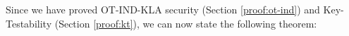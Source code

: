 Since we have proved OT-IND-KLA security (Section
\ref{proof:ot-ind}) and Key-Testability (Section
\ref{proof:kt}), we can now state the following theorem:






\begin{comment}
We will now use the fact that for a BB84-based SKE-CD
scheme $\SKECD$, the deterministic algorithm $\SKECD.\CDec$
satisfies the following property. Let $\skecd.\sk$ be a secret key
of $\SKECD$ and $\aux_0$ be generated by $\SKECD.\qEnc(\skecd.\sk,
\cdot)$. Let $u, u' \in \bit^\ctlen$ be any
strings such that for all $i$ such that $\theta[i]=0$, $u[i] =
u[i']$. Then, it must be that $\SKECD.\CDec(\skecd.\sk, u,
\aux_0) = \SKECD.\CDec(\skecd.\sk, u', \aux_0)$.
As a
consequence, for all valid $\ct$, it must also hold that
$\SKECRSKL.\CDec(u \| \aux_0, \ct) = \SKECRSKL.\CDec(u' \|
\aux_0, \ct)$.

Let $\ct^\star = \SKECRSKL.\Enc(\msk, m)$. Now, let $\qA$ succeed in
breaking key-testability for the key with index $k$. Let $x'$ be the
sub-string of $\dk$ over the register $\qreg{SKECD.CT}$. By
assumption, we have that $\SKECRSKL.\CDec(x' \| \aux_0,
\ct^\star) \neq m$, where $\aux_0$ is generated as part of the
generation of $\qdk_k$. Let $(x, \theta, S)$ denote the verification
key for $\qdk_k$.
Since $\SKECRSKL.\CDec$ is applied in superposition based on the
state on register $\qreg{\SKECD.CT}$, from the
Classical Decryption Property of $\SKECRSKL$, there must be some
computational basis state $u^\star$ on register
$\qreg{SKECD.CT}$ corresponding to the decryption key $\qdk_k$ such
that $\SKECRSKL.\CDec(u^\star \| \aux_0, \ct^\star) = m$
holds. Using the aforementioned property, we have that
$\SKECRSKL.\CDec(x \| \aux_0, \ct^\star) = m$. Again from the
aforementioned property and the fact that $\KeyTest$ checks $\aux_0$
is consistent, there must be at least one index $i \in [\ctlen]$
such that $\theta[i] = 0$ and $x'[i] \neq x[i]$.  With probability
$\frac{1}{\ctlen}$, we have that the guessed index $i^\star$ equals
$i$. In this case, for $\qA$ to pass key-testability, it must be the
case that the value $s_{i^\star}$ is a valid pre-image of
$t_{i^\star, 1-x[i^\star]}$ under $f$.  Consequently, $\qR$ breaks
the security of the OWF $f$.

\nikhil{SKECD has a classical part apart from the BB84 state. I
changed this but the inconsistencies need to be fixed.}
\end{comment}
